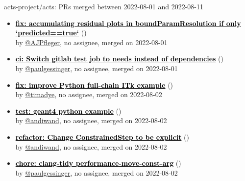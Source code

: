\begin{frame}[allowframebreaks]{ acts-project/acts: PRs merged 
between 2022-08-01 and 2022-08-11
}

  \begin{itemize}
    
    \item\prmerged\textbf{\href{https://github.com/acts-project/acts/pull/1355}{\textcolor{black}{fix: accumulating residual plots in boundParamResolution if only `predicted==true`}}}
    (\href{https://github.com/acts-project/acts/pull/1355}{}) \\
    by \href{https://github.com/AJPfleger}{@AJPfleger}, {}no assignee, merged on 2022-08-01

    \item\prmerged\textbf{\href{https://github.com/acts-project/acts/pull/1349}{\textcolor{black}{ci: Switch gitlab test job to needs instead of dependencies}}}
    (\href{https://github.com/acts-project/acts/pull/1349}{}) \\
    by \href{https://github.com/paulgessinger}{@paulgessinger}, {}no assignee, merged on 2022-08-01

    \item\prmerged\textbf{\href{https://github.com/acts-project/acts/pull/1356}{\textcolor{black}{fix: improve Python full-chain ITk example}}}
    (\href{https://github.com/acts-project/acts/pull/1356}{}) \\
    by \href{https://github.com/timadye}{@timadye}, {}no assignee, merged on 2022-08-02

    \item\prmerged\textbf{\href{https://github.com/acts-project/acts/pull/1334}{\textcolor{black}{test: geant4 python example}}}
    (\href{https://github.com/acts-project/acts/pull/1334}{}) \\
    by \href{https://github.com/andiwand}{@andiwand}, {}no assignee, merged on 2022-08-02

    \item\prmerged\textbf{\href{https://github.com/acts-project/acts/pull/1347}{\textcolor{black}{refactor: Change ConstrainedStep to be explicit}}}
    (\href{https://github.com/acts-project/acts/pull/1347}{}) \\
    by \href{https://github.com/andiwand}{@andiwand}, {}no assignee, merged on 2022-08-02

    \item\prmerged\textbf{\href{https://github.com/acts-project/acts/pull/1359}{\textcolor{black}{chore: clang-tidy performance-move-const-arg}}}
    (\href{https://github.com/acts-project/acts/pull/1359}{}) \\
    by \href{https://github.com/paulgessinger}{@paulgessinger}, {}no assignee, merged on 2022-08-02


\end{itemize}
\end{frame}
